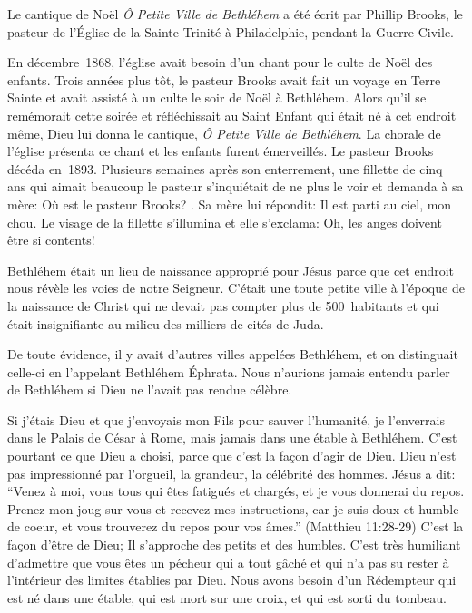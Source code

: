 

Le cantique de Noël \emph{Ô Petite Ville de Bethléhem} a été écrit par Phillip Brooks, le pasteur de l'Église de la Sainte Trinité à Philadelphie, pendant la Guerre Civile.

En décembre~1868, l'église avait besoin d'un chant pour le culte de Noël des enfants. Trois années plus tôt, le pasteur Brooks avait fait un voyage en Terre Sainte et avait assisté à un culte le soir de Noël à Bethléhem. Alors qu'il se remémorait cette soirée et réfléchissait au Saint Enfant qui était né à cet endroit même, Dieu lui donna le cantique, \emph{Ô Petite Ville de Bethléhem}. La chorale de l'église présenta ce chant et les enfants furent émerveillés. Le pasteur Brooks décéda en~1893. Plusieurs semaines après son enterrement, une fillette de cinq ans qui aimait beaucoup le pasteur s'inquiétait de ne plus le voir et demanda à sa mère: \og Où est le pasteur Brooks? \fg{}. Sa mère lui répondit: \og Il est parti au ciel, mon chou. \fg{} Le visage de la fillette s'illumina et elle s'exclama: \og Oh, les anges doivent être si contents! \fg{}

Bethléhem était un lieu de naissance approprié pour Jésus parce que cet endroit nous révèle les voies de notre Seigneur. C'était une toute petite ville à l'époque de la naissance de Christ qui ne devait pas compter plus de 500~habitants et qui était insignifiante au milieu des milliers de cités de Juda.

De toute évidence, il y avait d'autres villes appelées Bethléhem, et on distinguait celle-ci en l'appelant Bethléhem Éphrata. Nous n'aurions jamais entendu parler de Bethléhem si Dieu ne l'avait pas rendue célèbre.

Si j'étais Dieu et que j'envoyais mon Fils pour sauver l'humanité, je l'enverrais dans le Palais de César à Rome, mais jamais dans une étable à Bethléhem. C'est pourtant ce que Dieu a choisi, parce que c'est la façon d'agir de Dieu. Dieu n'est pas impressionné par l'orgueil, la grandeur, la célébrité des hommes. Jésus a dit:
“Venez à moi, vous tous qui êtes fatigués et chargés, et je vous donnerai du repos. Prenez mon joug sur vous et recevez mes instructions, car je suis doux et humble de coeur, et vous trouverez du repos pour vos âmes.” (Matthieu 11:28-29)
C'est la façon d'être de Dieu; Il s'approche des petits et des humbles. C'est très humiliant d'admettre que vous êtes un pécheur qui a tout gâché et qui n'a pas su rester à l'intérieur des limites établies par Dieu. Nous avons besoin d'un Rédempteur qui est né dans une étable, qui est mort sur une croix, et qui est sorti du tombeau.


